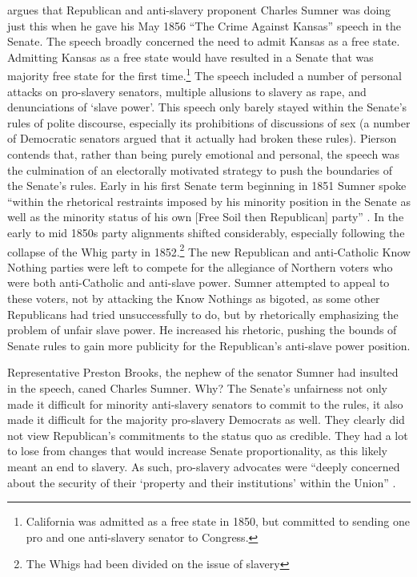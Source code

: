 \documentclass[a4paper]{article}\usepackage[]{graphicx}\usepackage[]{color}
\begin{document}
\cite{Pierson1995} argues that Republican and anti-slavery proponent Charles Sumner was doing just this when he gave his May 1856 ``The Crime Against Kansas'' speech in the Senate. The speech broadly concerned the need to admit Kansas as a free state. Admitting Kansas as a free state would have resulted in a Senate that was majority free state for the first time.\footnote{California was admitted as a free state in 1850, but committed to sending one pro and one anti-slavery senator to Congress.} The speech included a number of personal attacks on pro-slavery senators, multiple allusions to slavery as rape, and denunciations of `slave power'. This speech only barely stayed within the Senate's rules of polite discourse, especially its prohibitions of discussions of sex (a number of Democratic senators argued that it actually had broken these rules). Pierson contends that, rather than being purely emotional and personal, the speech was the culmination of an electorally motivated strategy to push the boundaries of the Senate's rules. Early in his first Senate term beginning in 1851 Sumner spoke ``within the rhetorical restraints imposed by his minority position in the Senate as well as the minority status of his own [Free Soil then Republican] party'' \cite[534]{Pierson1995}. In the early to mid 1850s party alignments shifted considerably, especially following the collapse of the Whig party in 1852.\footnote{The Whigs had been divided on the issue of slavery} The new Republican and anti-Catholic Know Nothing parties were left to compete for the allegiance of Northern voters who were both anti-Catholic and anti-slave power. Sumner attempted to appeal to these voters, not by attacking the Know Nothings as bigoted, as some other Republicans had tried unsuccessfully to do, but by rhetorically emphasizing the problem of unfair slave power. He increased his rhetoric, pushing the bounds of Senate rules to gain more publicity for the Republican's anti-slave power position.

Representative Preston Brooks, the nephew of the senator Sumner had insulted in the speech, caned Charles Sumner. Why? The Senate's unfairness not only made it difficult for minority anti-slavery senators to commit to the rules, it also made it difficult for the majority pro-slavery Democrats as well. They clearly did not view Republican's commitments to the  status quo  as credible. They had a lot to lose from changes that would increase Senate proportionality, as this likely meant an end to slavery. As such, pro-slavery advocates were ``deeply concerned about the security of their `property and their institutions' within the Union'' \cite[281]{Mittal2013}.
\end{document}
